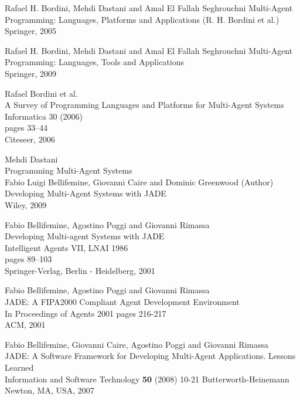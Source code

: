 \begin{thebibliography}{99}
Rafael H. Bordini, Mehdi Dastani and Amal El Fallah Seghrouchni
Multi-Agent Programming: Languages, Platforms and Applications (R. H. Bordini et al.)\\
Springer, 2005

Rafael H. Bordini, Mehdi Dastani and Amal El Fallah Seghrouchni
Multi-Agent Programming: Languages, Tools and Applications\\
Springer, 2009

Rafael Bordini et al.\\
A Survey of Programming Languages and Platforms for Multi-Agent Systems\\
Informatica 30 (2006)\\
pages 33–44\\
Citeseer, 2006

Mehdi Dastani\\
Programming Multi-Agent Systems\\


Fabio Luigi Bellifemine, Giovanni Caire and Dominic Greenwood (Author)
Developing Multi-Agent Systems with JADE\\
Wiley, 2009

Fabio Bellifemine, Agostino Poggi and Giovanni Rimassa\\
Developing Multi-agent Systems with JADE\\
Intelligent Agents VII, LNAI 1986\\
pages 89–103\\
Springer-Verlag, Berlin - Heidelberg, 2001

Fabio Bellifemine, Agostino Poggi and Giovanni Rimassa\\
JADE: A FIPA2000 Compliant Agent Development Environment\\
In Proceedings of Agents 2001
pages 216-217\\
ACM, 2001

Fabio Bellifemine, Giovanni Caire, Agostino Poggi and Giovanni Rimassa\\
JADE: A Software Framework for Developing Multi-Agent Applications. Lessons Learned\\
Information and Software Technology \textbf{50} (2008) 10-21
Butterworth-Heinemann Newton, MA, USA, 2007

\end{thebibliography}
